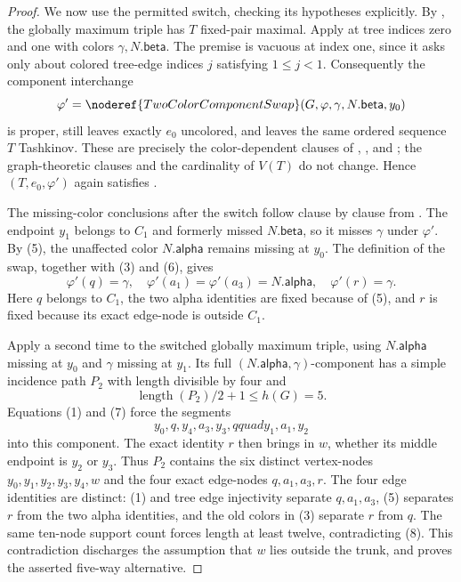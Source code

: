 \begin{proof}
We now use the permitted switch, checking its hypotheses explicitly.
By , the globally maximum
triple has $T$ fixed-pair maximal.  Apply
 at tree indices zero and one with colors
$\gamma,N.\mathsf{beta}$.  The premise
 is vacuous at index one, since it asks
only about colored tree-edge indices $j$ satisfying $1\leq j<1$.
Consequently the component interchange
\[
 \varphi'=\noderef{TwoColorComponentSwap}
   (G,\varphi,\gamma,N.\mathsf{beta},y_0)
\]
is proper, still leaves exactly $e_0$ uncolored, and leaves the same
ordered sequence $T$ Tashkinov.  These are precisely the color-dependent
clauses of , , and
; the graph-theoretic clauses and the cardinality
of $V(T)$ do not change.  Hence $(T,e_0,\varphi')$ again satisfies
.

The missing-color conclusions after the switch follow clause by clause
from .  The endpoint $y_1$
belongs to $C_1$ and formerly missed $N.\mathsf{beta}$, so it misses
$\gamma$ under $\varphi'$.  By (5), the unaffected color
$N.\mathsf{alpha}$ remains missing at $y_0$.  The definition of the swap,
together with (3) and (6), gives
\[
 \varphi'(q)=\gamma,\quad
 \varphi'(a_1)=\varphi'(a_3)=N.\mathsf{alpha},\quad
 \varphi'(r)=\gamma.                                \tag{7}
\]
Here $q$ belongs to $C_1$, the two alpha identities are fixed because of
(5), and $r$ is fixed because its exact edge-node is outside $C_1$.

Apply  a second time to the switched
globally maximum triple, using $N.\mathsf{alpha}$ missing at $y_0$ and
$\gamma$ missing at $y_1$.  Its full
$(N.\mathsf{alpha},\gamma)$-component has a simple incidence path $P_2$
with length divisible by four and
\[
 \operatorname{length}(P_2)/2+1\leq h(G)=5.          \tag{8}
\]
Equations (1) and (7) force the segments
\[
 y_0,q,y_4,a_3,y_3,qquad y_1,a_1,y_2
\]
into this component.  The exact identity $r$ then brings in $w$, whether
its middle endpoint is $y_2$ or $y_3$.  Thus $P_2$ contains the six
distinct vertex-nodes $y_0,y_1,y_2,y_3,y_4,w$ and the four exact
edge-nodes $q,a_1,a_3,r$.  The four edge identities are distinct: (1) and
tree edge injectivity separate $q,a_1,a_3$, (5) separates $r$ from the
two alpha identities, and the old colors in (3) separate $r$ from $q$.
The same ten-node support count forces length at least twelve, contradicting
(8).  This contradiction discharges the assumption that $w$ lies outside
the trunk, and proves the asserted five-way alternative.
\end{proof}
